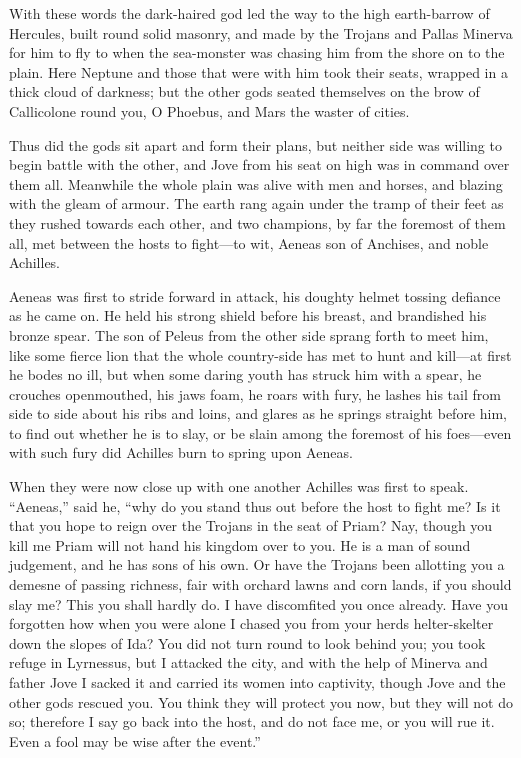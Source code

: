 With these words the dark-haired god led the way to the high earth-barrow
of Hercules, built round solid masonry, and made by the Trojans and Pallas
Minerva for him to fly to when the sea-monster was chasing him from the
shore on to the plain. Here Neptune and those that were with him took
their seats, wrapped in a thick cloud of darkness; but the other gods
seated themselves on the brow of Callicolone round you, O Phoebus, and
Mars the waster of cities.

Thus did the gods sit apart and form their plans, but neither side was
willing to begin battle with the other, and Jove from his seat on high was
in command over them all. Meanwhile the whole plain was alive with men and
horses, and blazing with the gleam of armour. The earth rang again under
the tramp of their feet as they rushed towards each other, and two
champions, by far the foremost of them all, met between the hosts to fight—to
wit, Aeneas son of Anchises, and noble Achilles.

Aeneas was first to stride forward in attack, his doughty helmet tossing
defiance as he came on. He held his strong shield before his breast, and
brandished his bronze spear. The son of Peleus from the other side sprang
forth to meet him, like some fierce lion that the whole country-side has
met to hunt and kill—at first he bodes no ill, but when some daring
youth has struck him with a spear, he crouches openmouthed, his jaws foam,
he roars with fury, he lashes his tail from side to side about his ribs
and loins, and glares as he springs straight before him, to find out
whether he is to slay, or be slain among the foremost of his foes—even
with such fury did Achilles burn to spring upon Aeneas.

When they were now close up with one another Achilles was first to speak.
“Aeneas,” said he, “why do you stand thus out before the host to fight me?
Is it that you hope to reign over the Trojans in the seat of Priam? Nay,
though you kill me Priam will not hand his kingdom over to you. He is a
man of sound judgement, and he has sons of his own. Or have the Trojans
been allotting you a demesne of passing richness, fair with orchard lawns
and corn lands, if you should slay me? This you shall hardly do. I have
discomfited you once already. Have you forgotten how when you were alone I
chased you from your herds helter-skelter down the slopes of Ida? You did
not turn round to look behind you; you took refuge in Lyrnessus, but I
attacked the city, and with the help of Minerva and father Jove I sacked
it and carried its women into captivity, though Jove and the other gods
rescued you. You think they will protect you now, but they will not do so;
therefore I say go back into the host, and do not face me, or you will rue
it. Even a fool may be wise after the event.”

